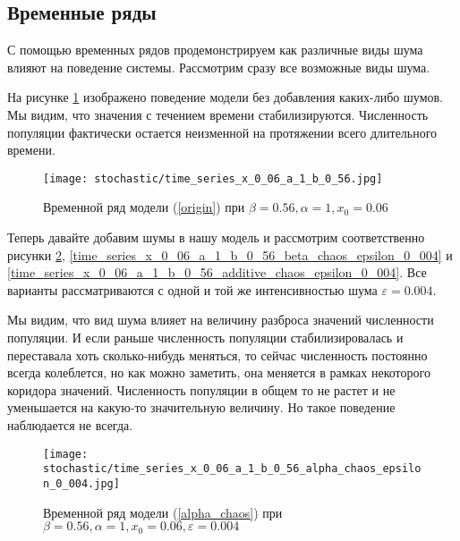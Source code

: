     \subsection{Временные ряды}

        С помощью временных рядов продемонстрируем как различные виды шума влияют на поведение системы. Рассмотрим сразу все возможные виды шума. 

        На рисунке \ref{time_series_x_0_06_a_1_b_0_56} изображено поведение модели без добавления каких-либо шумов. Мы видим, что значения с течением времени стабилизируются. Численность популяции фактически остается неизменной на протяжении всего длительного времени.

        \begin{figure}
            \centering
            \texttt{[image: stochastic/time\_series\_x\_0\_06\_a\_1\_b\_0\_56.jpg]}

            \captionsetup{justification=centering}
            \caption{Временной ряд модели (\ref{origin}) при \(\beta = 0.56, \alpha = 1, x_0 = 0.06\)}
            \label{time_series_x_0_06_a_1_b_0_56}
        \end{figure}

        Теперь давайте добавим шумы в нашу модель и рассмотрим соответственно рисунки \ref{time_series_x_0_06_a_1_b_0_56_alpha_chaos_epsilon_0_004}, \ref{time_series_x_0_06_a_1_b_0_56_beta_chaos_epsilon_0_004} и \ref{time_series_x_0_06_a_1_b_0_56_additive_chaos_epsilon_0_004}. Все варианты рассматриваются с одной и той же интенсивностью шума \(\varepsilon = 0.004\). 
        
        Мы видим, что вид шума влияет на величину разброса значений численности популяции.  И если раньше численность популяции стабилизировалась и переставала хоть сколько-нибудь меняться, то сейчас численность постоянно всегда колеблется, но как можно заметить, она меняется в рамках некоторого коридора значений. Численность популяции в общем то не растет и не уменьшается на какую-то значительную величину. Но такое поведение наблюдается не всегда.




        \begin{figure}
            \centering
            \texttt{[image: stochastic/time\_series\_x\_0\_06\_a\_1\_b\_0\_56\_alpha\_chaos\_epsilon\_0\_004.jpg]}
        
            \captionsetup{justification=centering}
            \caption{Временной ряд модели (\ref{alpha_chaos}) при \(\beta = 0.56, \alpha = 1, x_0 = 0.06, \varepsilon = 0.004\)}
            \label{time_series_x_0_06_a_1_b_0_56_alpha_chaos_epsilon_0_004}
        \end{figure}

